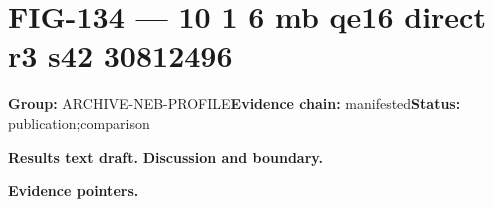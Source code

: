\clearpage
\section{FIG-134 --- 10 1 6 mb qe16 direct r3 s42 30812496}
\label{figpage:fig-134}
\textbf{Group:} ARCHIVE-NEB-PROFILE\quad \textbf{Evidence chain:} manifested\quad \textbf{Status:} publication;comparison

\textbf{Results text draft.} 
\textbf{Discussion and boundary.} 


\textbf{Evidence pointers.}



\vfill
